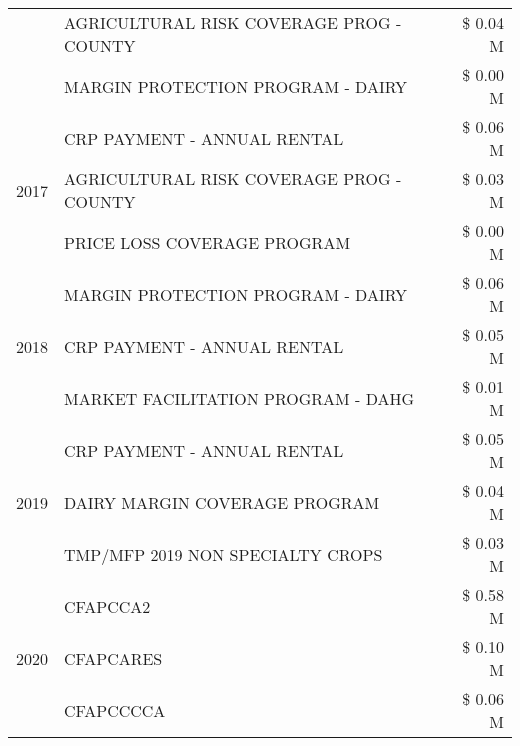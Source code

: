 \begin{tabular}{llr}
 & AGRICULTURAL RISK COVERAGE PROG - COUNTY & \$ 0.04 M \\
 & MARGIN PROTECTION PROGRAM - DAIRY & \$ 0.00 M \\
\cline{1-3}
\multirow[t]{3}{*}{2017} & CRP PAYMENT - ANNUAL RENTAL & \$ 0.06 M \\
 & AGRICULTURAL RISK COVERAGE PROG - COUNTY & \$ 0.03 M \\
 & PRICE LOSS COVERAGE PROGRAM & \$ 0.00 M \\
\cline{1-3}
\multirow[t]{3}{*}{2018} & MARGIN PROTECTION PROGRAM - DAIRY & \$ 0.06 M \\
 & CRP PAYMENT - ANNUAL RENTAL & \$ 0.05 M \\
 & MARKET FACILITATION PROGRAM - DAHG & \$ 0.01 M \\
\cline{1-3}
\multirow[t]{3}{*}{2019} & CRP PAYMENT - ANNUAL RENTAL & \$ 0.05 M \\
 & DAIRY MARGIN COVERAGE PROGRAM & \$ 0.04 M \\
 & TMP/MFP 2019 NON SPECIALTY CROPS & \$ 0.03 M \\
\cline{1-3}
\multirow[t]{3}{*}{2020} & CFAPCCA2 & \$ 0.58 M \\
 & CFAPCARES & \$ 0.10 M \\
 & CFAPCCCCA & \$ 0.06 M \\
\cline{1-3}
\bottomrule
\end{tabular}
